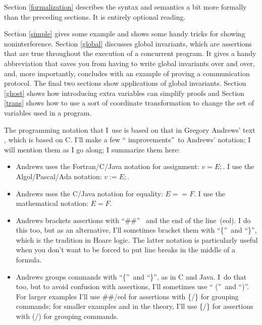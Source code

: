\documentclass[muchmore,11pt]{article}%
\begin{document}
Section \ref{formalization} describes the syntax and semantics a bit more
formally than the preceding sections. It is entirely optional reading.

Section \ref{simple} gives some example and shows some handy tricks for
showing noninterference. Section \ref{global} discusses global invariants,
which are assertions that are true throughout the execution of a concurrent
program. It gives a handy abbreviation that saves you from having to write
global invariants over and over, and, more importantly, concludes with an
example of proving a communication protocol. The final two sections show
applications of global invariants. Section \ref{ghost} shows how introducing
extra variables can simplify proofs and Section \ref{trans} shows how to use a
sort of coordinate transformation to change the set of variables used in a program.

The programming notation that I\ use is based on that in Gregory Andrews' text
\cite{Andrews2000}, which is based on C. I'll make a few \textquotedblleft
improvements\textquotedblright\ to Andrews' notation; I will mention them as I
go along; I summarize them here:

\begin{itemize}
\item Andrews uses the Fortran/C/Java notation for assignment: $v=E;$. I use
the Algol/Pascal/Ada notation: $v:=E;$.

\item Andrews uses the C/Java notation for equality: $E==F$. I use the
mathematical notation: $E=F$.

\item Andrews brackets assertions with \textquotedblleft\#\#\textquotedblright%
\ and the end of the line\ (eol). I do this too, but as an alternative, I'll
sometimes bracket them with \textquotedblleft\{\textquotedblright\ and
\textquotedblleft\}\textquotedblright, which is the tradition in Hoare logic.
The latter notation is particularly useful when you don't want to be forced to
put line breaks in the middle of a formula.

\item Andrews groups commands with \textquotedblleft\{\textquotedblright\ and
\textquotedblleft\}\textquotedblright, as in C and Java. I\ do that too, but
to avoid confusion with assertions, I'll sometimes use \textquotedblleft%
(\textquotedblright\ and \textquotedblleft)\textquotedblright. For larger
examples I'll use \#\#/eol for assertions with \{/\} for grouping commands;
for smaller examples and in the theory, I'll use \{/\} for assertions with (/)
for grouping commands.
\end{itemize}
\end{document}
